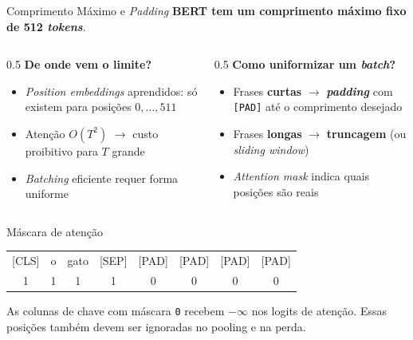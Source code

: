 \documentclass[aspectratio=169, xcolor=dvipsnames]{beamer}
\begin{document}
  \begin{frame}{Comprimento Máximo e \textit{Padding}}
    \textbf{BERT tem um comprimento máximo fixo de 512 \textit{tokens}}.
    \vspace{0.4em}
    \begin{columns}
      \begin{column}{0.5\textwidth}
        \textbf{De onde vem o limite?}
        \begin{itemize}
          \item \textit{Position embeddings} aprendidos: só existem para posições $0, \ldots, 511$
          \item Atenção $O(T^2)$ $\to$ custo proibitivo para $T$ grande
          \item \textit{Batching} eficiente requer forma uniforme
        \end{itemize}
      \end{column}
      \begin{column}{0.5\textwidth}
        \textbf{Como uniformizar um \textit{batch}?}
        \begin{itemize}
          \item Frases \textbf{curtas} $\to$ \textbf{\textit{padding}} com \texttt{[PAD]} até o comprimento desejado
          \item Frases \textbf{longas} $\to$ \textbf{truncagem} (ou \textit{sliding window})
          \item \textit{Attention mask} indica quais posições são reais
        \end{itemize}
      \end{column}
    \end{columns}
    \vspace{0.4em}
    \begin{exampleblock}{Máscara de atenção}
      \centering
      \ttfamily\small
      \begin{tabular}{cccccccc}
        {[CLS]} & o & gato & {[SEP]} & {[PAD]} & {[PAD]} & {[PAD]} & {[PAD]} \\[2pt]
        1 & 1 & 1 & 1 & 0 & 0 & 0 & 0 \\
      \end{tabular}
      \rmfamily

      \vspace{0.3em}
      As colunas de chave com máscara \texttt{0} recebem $-\infty$
      nos logits de atenção. Essas posições também devem ser ignoradas no pooling e na perda.
    \end{exampleblock}
  \end{frame}
\end{document}
